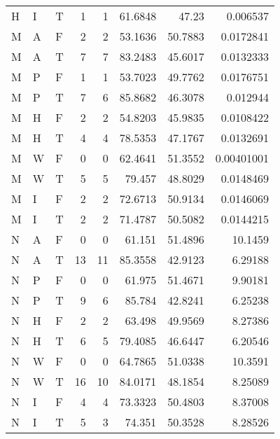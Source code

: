 \begin{tabular}{lllrrrrr}
    H     & I     & T          & 1    & 1     & 61.6848    & 47.23    & 0.006537   \\
    M     & A     & F          & 2    & 2     & 53.1636    & 50.7883  & 0.0172841  \\
    M     & A     & T          & 7    & 7     & 83.2483    & 45.6017  & 0.0132333  \\
    M     & P     & F          & 1    & 1     & 53.7023    & 49.7762  & 0.0176751  \\
    M     & P     & T          & 7    & 6     & 85.8682    & 46.3078  & 0.012944   \\
    M     & H     & F          & 2    & 2     & 54.8203    & 45.9835  & 0.0108422  \\
    M     & H     & T          & 4    & 4     & 78.5353    & 47.1767  & 0.0132691  \\
    M     & W     & F          & 0    & 0     & 62.4641    & 51.3552  & 0.00401001 \\
    M     & W     & T          & 5    & 5     & 79.457     & 48.8029  & 0.0148469  \\
    M     & I     & F          & 2    & 2     & 72.6713    & 50.9134  & 0.0146069  \\
    M     & I     & T          & 2    & 2     & 71.4787    & 50.5082  & 0.0144215  \\
    N     & A     & F          & 0    & 0     & 61.151     & 51.4896  & 10.1459    \\
    N     & A     & T          & 13   & 11    & 85.3558    & 42.9123  & 6.29188    \\
    N     & P     & F          & 0    & 0     & 61.975     & 51.4671  & 9.90181    \\
    N     & P     & T          & 9    & 6     & 85.784     & 42.8241  & 6.25238    \\
    N     & H     & F          & 2    & 2     & 63.498     & 49.9569  & 8.27386    \\
    N     & H     & T          & 6    & 5     & 79.4085    & 46.6447  & 6.20546    \\
    N     & W     & F          & 0    & 0     & 64.7865    & 51.0338  & 10.3591    \\
    N     & W     & T          & 16   & 10    & 84.0171    & 48.1854  & 8.25089    \\
    N     & I     & F          & 4    & 4     & 73.3323    & 50.4803  & 8.37008    \\
    N     & I     & T          & 5    & 3     & 74.351     & 50.3528  & 8.28526    \\
    \hline
\end{tabular}